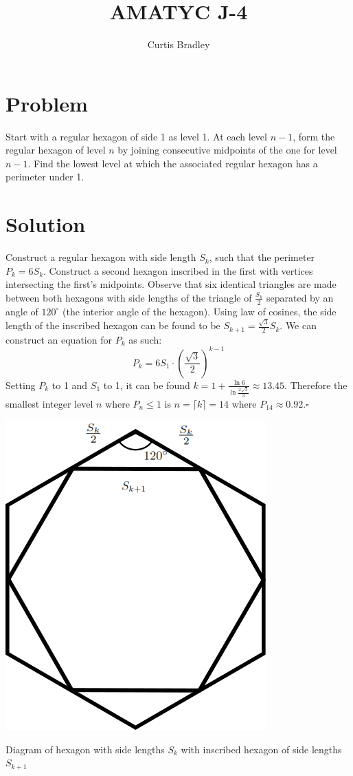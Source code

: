 \documentclass{article}
\title{AMATYC J-4}
\author{Curtis Bradley}
\begin{document}
\maketitle

\section{Problem} Start with a regular hexagon of side 1 as level 1. At each level $n -1$, form the regular hexagon of level $n$ by joining consecutive midpoints of the one for level $n-1$. Find the lowest level at which the associated regular hexagon has a perimeter under 1.
\section{Solution}
Construct a regular hexagon with side length $S_k$, such that the perimeter $P_k = 6S_k$. 
Construct a second hexagon inscribed in the first with vertices intersecting the first's midpoints. 
Observe that six identical triangles are made between both hexagons with side lengths of the triangle of $\frac{S_k}{2}$ separated by an angle of $120^\circ$ (the interior angle of the hexagon). 
Using law of cosines, the side length of the inscribed hexagon can be found to be  $S_{k+1} = \frac{\sqrt{3}}{2}S_k$. 
We can construct an equation for $P_k$ as such:
\[P_k = 6 S_1 \cdot\left(\frac{\sqrt{3}}{2}\right)^{k-1}\]
Setting $P_k$ to 1 and $S_1$ to 1, it can be found $k=1 + \frac{\ln{6}}{\ln{\frac{2\sqrt{3}}{3}}} \approx 13.45$. Therefore the smallest integer level $n$ where $P_n \leq 1$ is $n = \lceil{k}\rceil = 14$ where $P_{14}\approx0.92$.$\square$


\begin{center}
    \includegraphics[scale=0.5]{hexagon.png}

    Diagram of hexagon with side lengths $S_k$ with inscribed hexagon of side lengths $S_{k+1}$
\end{center}
\end{document}
